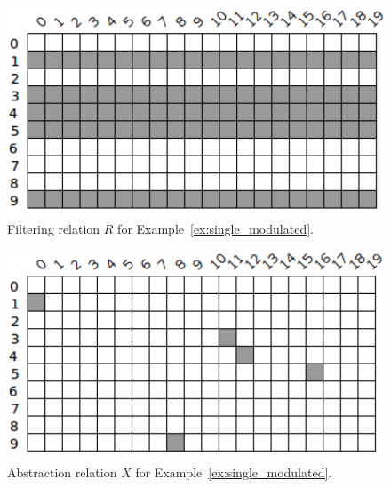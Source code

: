 \begin{example}
	\begin{figure}[ht]
		\centering
		\includegraphics[scale=0.65]{Figures/PDF/Relview/R.pdf}
		\caption{Filtering relation $R$ for Example~\ref{ex:single_modulated}.}
		\label{fig:single_modulated_r}
	\end{figure}
	
	\begin{figure}[ht]
		\centering
		\includegraphics[scale=0.65]{Figures/PDF/Relview/XNP.pdf}
		\caption{Abstraction relation $X$ for Example~\ref{ex:single_modulated}.}
		\label{fig:single_modulated_x}
	\end{figure}
	
	\newpage
\end{example}